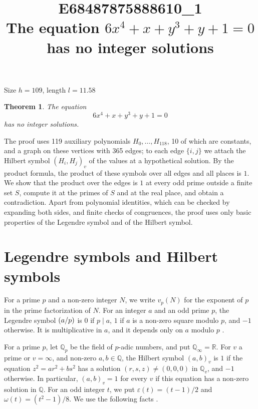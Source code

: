 \documentclass[11pt]{article}
\title{\textbf{E68487875888610\_1}\\[4pt] {\Large The equation $6x^{4}+x+y^{3}+y+1=0$ has no integer solutions}}
\author{}
\date{}
\newtheorem{theorem}{Theorem}
\newcommand{\Q}{\mathbb{Q}}
\newcommand{\leg}[2]{\mathchoice{\biggl(\dfrac{#1}{#2}\biggr)}{(#1/#2)}{(#1/#2)}{(#1/#2)}}
\begin{document}
\maketitle
\vspace{-8ex}
\begin{center}
Size $h=109$, length $l=11.58$
\end{center}

\begin{theorem}\label{thm:main}
The equation
\begin{equation}\label{eq:main}
6x^{4}+x+y^{3}+y+1=0
\end{equation}
has no integer solutions.
\end{theorem}

The proof uses 119 auxiliary polynomials $H_0,\dots,H_{118}$, 10 of which are constants, and a graph on these vertices with 365 edges; to each edge $\{i,j\}$ we attach the Hilbert symbol $(H_i,H_j)_v$ of the values at a hypothetical solution. By the product formula, the product of these symbols over all edges and all places is $1$. We show that the product over the edges is $1$ at every odd prime outside a finite set $S$, compute it at the primes of $S$ and at the real place, and obtain a contradiction. Apart from polynomial identities, which can be checked by expanding both sides, and finite checks of congruences, the proof uses only basic properties of the Legendre symbol and of the Hilbert symbol.

\section{Legendre symbols and Hilbert symbols}

For a prime $p$ and a non-zero integer $N$, we write $v_p(N)$ for the exponent of $p$ in the prime factorization of $N$. For an integer $a$ and an odd prime $p$, the Legendre symbol $\leg{a}{p}$ is $0$ if $p\mid a$, $1$ if $a$ is a non-zero square modulo $p$, and $-1$ otherwise. It is multiplicative in $a$, and it depends only on $a$ modulo $p$ \cite[Chapter~5]{IR}.

For a prime $p$, let $\Q_p$ be the field of $p$-adic numbers, and put $\Q_\infty=\mathbb R$. For $v$ a prime or $v=\infty$, and non-zero $a,b\in\Q$, the Hilbert symbol $(a,b)_v$ is $1$ if the equation $z^2=ar^2+bs^2$ has a solution $(r,s,z)\neq(0,0,0)$ in $\Q_v$, and $-1$ otherwise. In particular, $(a,b)_v=1$ for every $v$ if this equation has a non-zero solution in $\Q$. For an odd integer $t$, we put $\varepsilon(t)=(t-1)/2$ and $\omega(t)=(t^2-1)/8$. We use the following facts \cite[Chapter~III, Proposition~2 and Theorems~1 and~3]{Se}.
\end{document}
